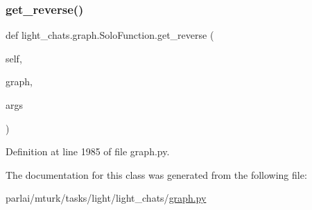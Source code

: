 \subsubsection{\texorpdfstring{get\+\_\+reverse()}{get\_reverse()}}
{\footnotesize\ttfamily def light\+\_\+chats.\+graph.\+Solo\+Function.\+get\+\_\+reverse (\begin{DoxyParamCaption}\item[{}]{self,  }\item[{}]{graph,  }\item[{}]{args }\end{DoxyParamCaption})}



Definition at line 1985 of file graph.\+py.



The documentation for this class was generated from the following file\+:\begin{DoxyCompactItemize}
\item 
parlai/mturk/tasks/light/light\+\_\+chats/\hyperlink{parlai_2mturk_2tasks_2light_2light__chats_2graph_8py}{graph.\+py}\end{DoxyCompactItemize}
